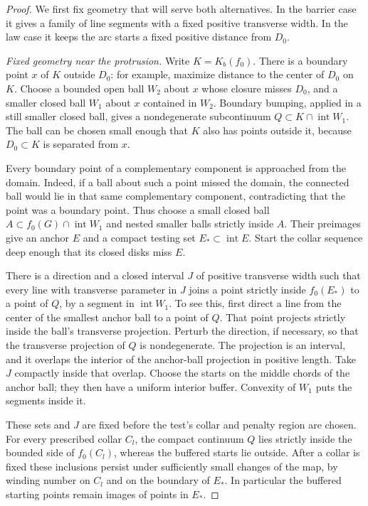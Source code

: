 \begin{proof}
We first fix geometry that will serve both alternatives.  In the
barrier case it gives a family of line segments with a fixed positive
transverse width.  In the law case it keeps the arc starts a fixed
positive distance from $D_0$.

\smallskip\noindent\emph{Fixed geometry near the protrusion.}
Write $K=K_b(f_0)$.  There is a boundary point $x$ of $K$ outside
$D_0$: for example, maximize distance to the center of $D_0$ on $K$.
Choose a bounded open ball $W_2$ about $x$ whose closure misses $D_0$,
and a smaller closed ball $W_1$ about $x$ contained in $W_2$.
Boundary bumping, applied in a still smaller closed ball, gives a
nondegenerate subcontinuum $Q\subset K\cap\operatorname{int}W_1$.
The ball can be chosen small enough that $K$ also has points outside
it, because $D_0\subset K$ is separated from $x$.

Every boundary point of a complementary component is approached from
the domain.  Indeed, if a ball about such a point missed the domain,
the connected ball would lie in that same complementary component,
contradicting that the point was a boundary point.  Thus choose a
small closed ball $A\subset f_0(G)\cap\operatorname{int}W_1$ and
nested smaller balls strictly inside $A$.  Their preimages give an
anchor $E$ and a compact testing set
$E_*\subset\operatorname{int}E$.  Start the collar sequence deep
enough that its closed disks miss $E$.

There is a direction and a closed interval $J$ of positive transverse
width such that every line with transverse parameter in $J$ joins a
point strictly inside $f_0(E_*)$ to a point of $Q$, by a segment in
$\operatorname{int}W_1$.  To see this, first direct a line from the
center of the smallest anchor ball to a point of $Q$.  That point
projects strictly inside the ball's transverse projection.  Perturb
the direction, if necessary, so that the transverse projection of
$Q$ is nondegenerate.  The projection is an interval, and it overlaps
the interior of the anchor-ball projection in positive length.  Take
$J$ compactly inside that overlap.  Choose the starts on the middle
chords of the anchor ball; they then have a uniform interior buffer.
Convexity of $W_1$ puts the segments inside it.

These sets and $J$ are fixed before the test's collar and penalty
region are chosen.  For every prescribed collar $C_l$, the compact
continuum
$Q$ lies strictly inside the bounded side of $f_0(C_l)$, whereas the
buffered starts lie outside.  After a collar is fixed these inclusions
persist under sufficiently small changes of the map, by winding
number on $C_l$ and on the boundary of $E_*$.  In particular the
buffered starting points remain images of points in $E_*$.


\end{proof}
